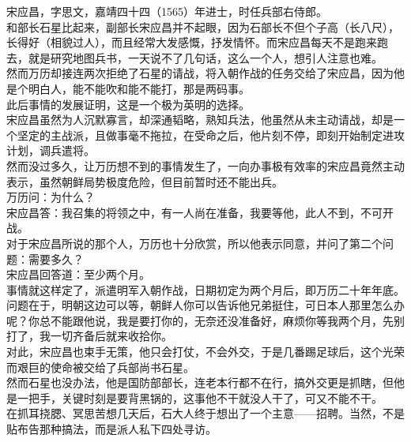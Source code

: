 \begin{multicols}{\theparacolNo}
宋应昌，字思文，嘉靖四十四（1565）年进士，时任兵部右侍郎。\\

和部长石星比起来，副部长宋应昌并不起眼，因为石部长不但个子高（长八尺），长得好（相貌过人），而且经常大发感慨，抒发情怀。而宋应昌每天不是跑来跑去，就是研究地图兵书，一天说不了几句话，这么一个人，想引人注意也难。\\

然而万历却接连两次拒绝了石星的请战，将入朝作战的任务交给了宋应昌，因为他是个明白人，能不能吹和能不能打，那是两码事。\\

此后事情的发展证明，这是一个极为英明的选择。\\

宋应昌虽然为人沉默寡言，却深通韬略，熟知兵法，他虽然从未主动请战，却是一个坚定的主战派，且做事毫不拖拉，在受命之后，他片刻不停，即刻开始制定进攻计划，调兵遣将。\\

然而没过多久，让万历想不到的事情发生了，一向办事极有效率的宋应昌竟然主动表示，虽然朝鲜局势极度危险，但目前暂时还不能出兵。\\

万历问：为什么？\\

宋应昌答：我召集的将领之中，有一人尚在准备，我要等他，此人不到，不可开战。\\

对于宋应昌所说的那个人，万历也十分欣赏，所以他表示同意，并问了第二个问题：需要多久？\\

宋应昌回答道：至少两个月。\\

事情就这样定了，派遣明军入朝作战，日期初定为两个月后，即万历二十年年底。\\

问题在于，明朝这边可以等，朝鲜人你可以告诉他兄弟挺住，可日本人那里怎么办呢？你总不能跟他说，我是要打你的，无奈还没准备好，麻烦你等我两个月，先别打了，我一切齐备后就来收拾你。\\

对此，宋应昌也束手无策，他只会打仗，不会外交，于是几番踢足球后，这个光荣而艰巨的使命被交给了兵部尚书石星。\\

然而石星也没办法，他是国防部部长，连老本行都不在行，搞外交更是抓瞎，但他是一把手，关键时刻是要背黑锅的，这事他不干就没人干了，可又不能不干。\\

在抓耳挠腮、冥思苦想几天后，石大人终于想出了一个主意——招聘。当然，不是贴布告那种搞法，而是派人私下四处寻访。\\


\end{multicols}

